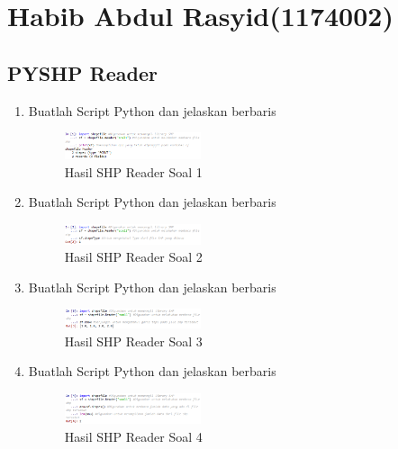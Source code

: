 \section{Habib Abdul Rasyid(1174002)}
\subsection{PYSHP Reader}
\begin{enumerate}
    \item Buatlah Script Python dan jelaskan berbaris
    
    \hfill\break
    \begin{figure}[H]
		\includegraphics[width=4cm]{figures/1174027/3/soal1.png}
		\centering
		\caption{Hasil SHP Reader Soal 1}
    \end{figure}
    
    \item Buatlah Script Python dan jelaskan berbaris
    
    \hfill\break
    \begin{figure}[H]
		\includegraphics[width=4cm]{figures/1174002/3/soal2.png}
		\centering
		\caption{Hasil SHP Reader Soal 2}
    \end{figure}
    
    \item Buatlah Script Python dan jelaskan berbaris
    
    \hfill\break
    \begin{figure}[H]
		\includegraphics[width=4cm]{figures/1174002/3/soal3.png}
		\centering
		\caption{Hasil SHP Reader Soal 3}
    \end{figure}
    
    \item Buatlah Script Python dan jelaskan berbaris
    
    \hfill\break
    \begin{figure}[H]
		\includegraphics[width=4cm]{figures/1174002/3/soal4.png}
		\centering
		\caption{Hasil SHP Reader Soal 4}
    \end{figure}
    

\end{enumerate}
